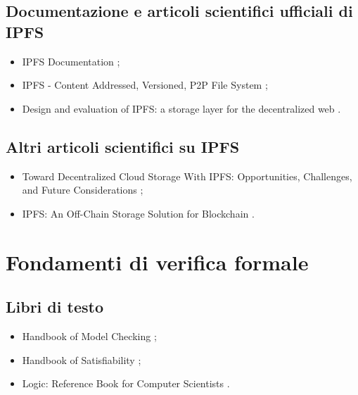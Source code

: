 \subsection*{Documentazione e articoli scientifici ufficiali di IPFS}
\begin{itemize}

\item IPFS Documentation \cite{ipfs2024doc};

\item IPFS - Content Addressed, Versioned, P2P File System \cite{benet2014ipfs};

\item Design and evaluation of IPFS: a storage layer for the decentralized web \cite{trautwein2023ipfs}.

\end{itemize}

\subsection*{Altri articoli scientifici su IPFS}
\begin{itemize}

\item Toward Decentralized Cloud Storage With IPFS: Opportunities, Challenges, and Future Considerations \cite{doan2022ipfs};

\item IPFS: An Off-Chain Storage Solution for Blockchain \cite{kaur2023ipfs}.

\end{itemize}

\section*{Fondamenti di verifica formale}

\subsection*{Libri di testo}
\begin{itemize}

\item Handbook of Model Checking \cite{clarke2018modelbook};

\item Handbook of Satisfiability \cite{biere2021satbook};

\item Logic: Reference Book for Computer Scientists \cite{polkowski2023logicbook}.

\end{itemize}

